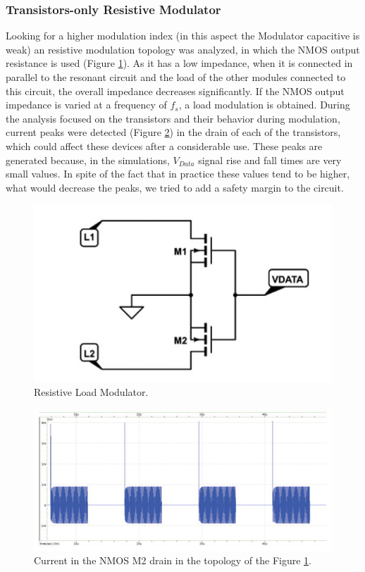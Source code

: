 \documentclass[a4paper, 10pt, conference]{ieeeconf}      %
\begin{document}
\subsubsection{Transistors-only Resistive Modulator}
Looking for a higher modulation index (in this aspect the Modulator capacitive is weak) an resistive modulation topology was analyzed, in which the NMOS output resistance is used (Figure  \ref{fig:Mod_carg_trans}). As it has a low impedance, when it is connected in parallel to the resonant circuit and the load of the other modules connected to this circuit, the overall impedance decreases significantly. If the NMOS output impedance is varied at a frequency of $f_s$, a load modulation is obtained. During the analysis focused on the transistors and their behavior during modulation, current peaks were detected (Figure \ref{fig:Picos_Cor}) in the drain of each of the transistors, which could affect these devices after a considerable use. These peaks are generated because, in the simulations, $V_{Data}$ signal rise and fall times are very small values. In spite of the fact that in practice these values tend to be higher, what would decrease the peaks, we tried to add a safety margin to the circuit.

\begin{figure}[H]
\centering
\includegraphics[scale=0.5]{Images/ImagenesTesina/Antecedentes/Modulacion_Carga_Trans.JPG}
\caption{Resistive Load Modulator.}
\label{fig:Mod_carg_trans}
\end{figure}

\begin{figure}[H]
\centering
\includegraphics[scale=0.4]{Images/ImagenesTesina/Antecedentes/Picos_Corriente.JPG}
\caption{Current in the NMOS M2 drain in the topology of the Figure  \ref{fig:Mod_carg_trans}.}
\label{fig:Picos_Cor}
\end{figure}
\end{document}
